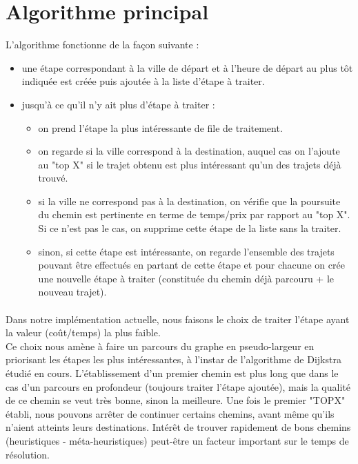 \documentclass[a4paper,10pt,twoside]{report}
\begin{document}
   \section{Algorithme principal}
    L'algorithme fonctionne de la façon suivante :\\
    \begin{itemize}
    \item une étape correspondant à la ville de départ et à l'heure de départ au plus tôt indiquée est créée puis ajoutée à la liste d'étape à traiter.
    \item jusqu'à ce qu'il n'y ait plus d'étape à traiter : \\
    \begin{itemize}
    \item on prend l'étape la plus intéressante de file de traitement.
    \item on regarde si la ville correspond à la destination, auquel cas on l'ajoute au "top X" si le trajet obtenu est plus intéressant qu'un des trajets déjà trouvé.
    \item si la ville ne correspond pas à la destination, on vérifie que la poursuite du chemin est pertinente en terme de temps/prix par rapport au "top X". Si ce n'est pas le cas, on supprime cette étape de la liste sans la traiter.
    \item sinon, si cette étape est intéressante, on regarde l'ensemble des trajets pouvant être effectués en partant de cette étape et pour chacune on crée une nouvelle étape à traiter (constituée du chemin déjà parcouru + le nouveau trajet).
    \end{itemize} 
    \end{itemize}
    
    \paragraph{}Dans notre implémentation actuelle, nous faisons le choix de traiter l'étape ayant la valeur (coût/temps) la plus faible.\\
    Ce choix nous amène à faire un parcours du graphe en pseudo-largeur en priorisant les étapes les plus intéressantes, à l'instar de l'algorithme de Dijkstra étudié en cours. L'établissement d'un premier chemin est plus long que dans le cas d'un parcours en profondeur (toujours traiter l'étape ajoutée), mais la qualité de ce chemin se veut très bonne, sinon la meilleure. Une fois le premier "TOPX" établi, nous pouvons arrêter de continuer certains chemins, avant même qu'ils n'aient atteints leurs destinations. Intérêt de trouver rapidement de bons chemins (heuristiques - méta-heuristiques) peut-être un facteur important sur le temps de résolution.
    
\end{document}
